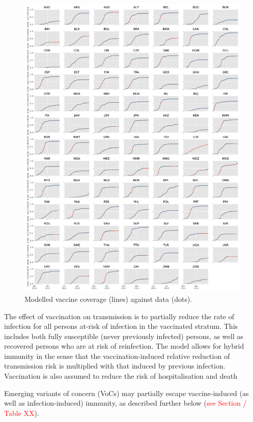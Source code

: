 \begin{figure}[h]
    \begin{center}
    \includegraphics[width=1.0\textwidth]{../../tex_descriptions/projects/sm_covid/vacc_coverage.pdf}
    \end{center}
    \caption{Modelled vaccine coverage (lines) against data (dots).
    } 
    \label{fig:vaccination}
\end{figure}

The effect of vaccination on transmission is to partially reduce the rate of infection for all persons at-risk of infection in the vaccinated stratum.
This includes both fully susceptible (never previously infected) persons,
as well as recovered persons who are at risk of reinfection. The model allows for hybrid immunity
in the sense that the vaccination-induced relative reduction of transmission risk is multiplied with that induced by previous infection. Vaccination is also assumed to reduce the risk of hospitalisation and death 

Emerging variants of concern (VoCs) may partially escape vaccine-induced (as well as infection-induced) immunity, as described further below (\textcolor{red}{see Section / Table XX}).

